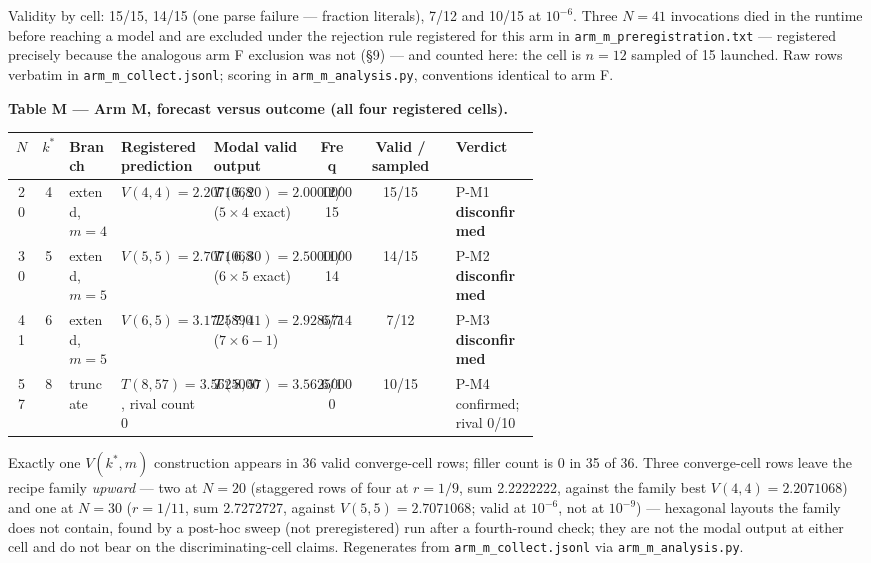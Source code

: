 Validity by cell: 15/15, 14/15 (one parse failure --- fraction literals), 7/12 and 10/15 at
$10^{-6}$. Three $N = 41$ invocations died in the runtime before reaching a model and are excluded
under the rejection rule registered for this arm in \texttt{arm\_m\_preregistration.txt} ---
registered precisely because the analogous arm F exclusion was not (\S9) --- and counted here: the
cell is $n = 12$ sampled of 15 launched. Raw rows verbatim in \texttt{arm\_m\_collect.jsonl}; scoring
in \texttt{arm\_m\_analysis.py}, conventions identical to arm F.

\textbf{Table M --- Arm M, forecast versus outcome (all four registered cells).}

\begin{center}
\begin{small}
\setlength{\tabcolsep}{3.5pt}
\begin{tabular}{@{}ccp{0.09\linewidth}p{0.16\linewidth}p{0.20\linewidth}ccp{0.16\linewidth}@{}}
\toprule
$N$ & $k^*$ & Branch & Registered prediction & Modal valid output & Freq & Valid / sampled & Verdict \\
\midrule
20 & 4 & extend, $m = 4$ & $V(4,4) = 2.2071068$ & $T(5,20) = 2.0000000$ ($5 \times 4$ exact) & 12/15 & 15/15 & P-M1 \textbf{disconfirmed} \\
30 & 5 & extend, $m = 5$ & $V(5,5) = 2.7071068$ & $T(6,30) = 2.5000000$ ($6 \times 5$ exact) & 11/14 & 14/15 & P-M2 \textbf{disconfirmed} \\
41 & 6 & extend, $m = 5$ & $V(6,5) = 3.1725890$ & $T(7,41) = 2.9285714$ ($7 \times 6 - 1$) & 6/7 & 7/12 & P-M3 \textbf{disconfirmed} \\
57 & 8 & truncate & $T(8,57) = 3.5625000$, rival count 0 & $T(8,57) = 3.5625000$ & 6/10 & 10/15 & P-M4 confirmed; rival 0/10 \\
\bottomrule
\end{tabular}
\end{small}
\end{center}

Exactly one $V(k^*, m)$ construction appears in 36 valid converge-cell rows; filler count is 0
in 35 of 36. Three converge-cell rows leave the recipe family \emph{upward} --- two at $N = 20$ (staggered rows of four at $r = 1/9$, sum 2.2222222, against the family best $V(4,4) = 2.2071068$) and one at $N = 30$ ($r = 1/11$, sum 2.7272727, against $V(5,5) = 2.7071068$; valid at $10^{-6}$, not at $10^{-9}$) --- hexagonal layouts the family does not contain, found by a post-hoc sweep (not preregistered) run after a fourth-round check; they are not the modal output at either cell and do not bear on the discriminating-cell claims. Regenerates from \texttt{arm\_m\_collect.jsonl} via \texttt{arm\_m\_analysis.py}.

